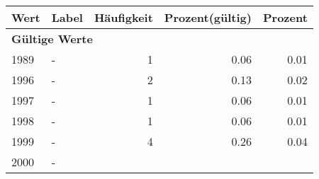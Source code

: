      \begin{longtable}{lXrrr}
     \toprule
     \textbf{Wert} & \textbf{Label} & \textbf{Häufigkeit} & \textbf{Prozent(gültig)} & \textbf{Prozent} \\
     \endhead
     \midrule
     \multicolumn{5}{l}{\textbf{Gültige Werte}}\\

     1989 &
     \multicolumn{1}{X}{ -  } &


       \num{1} &
       \num[round-mode=places,round-precision=2]{0.06} &
         \num[round-mode=places,round-precision=2]{0.01} \\

     1996 &
     \multicolumn{1}{X}{ -  } &


       \num{2} &
       \num[round-mode=places,round-precision=2]{0.13} &
         \num[round-mode=places,round-precision=2]{0.02} \\

     1997 &
     \multicolumn{1}{X}{ -  } &


       \num{1} &
       \num[round-mode=places,round-precision=2]{0.06} &
         \num[round-mode=places,round-precision=2]{0.01} \\

     1998 &
     \multicolumn{1}{X}{ -  } &


       \num{1} &
       \num[round-mode=places,round-precision=2]{0.06} &
         \num[round-mode=places,round-precision=2]{0.01} \\

     1999 &
     \multicolumn{1}{X}{ -  } &


       \num{4} &
       \num[round-mode=places,round-precision=2]{0.26} &
         \num[round-mode=places,round-precision=2]{0.04} \\

     2000 &
     \multicolumn{1}{X}{ -  } &



\end{longtable}
